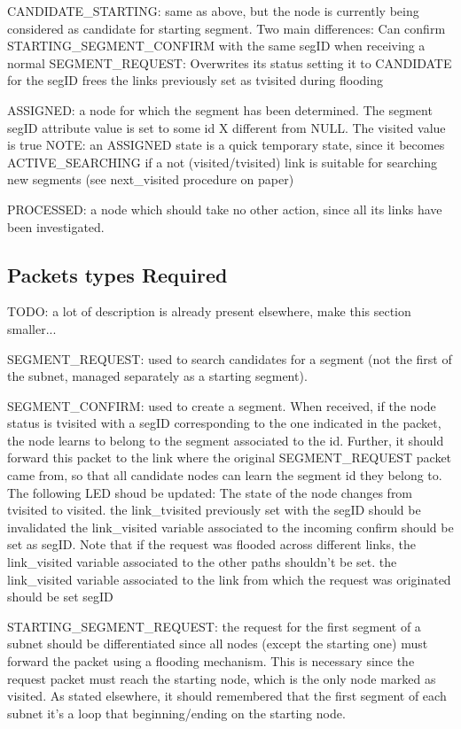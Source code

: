 \documentclass[conference]{IEEEtran}
\begin{document}
CANDIDATE\_STARTING:
same as above, but the node is currently being considered as candidate
for starting segment. Two main differences: Can confirm
STARTING\_SEGMENT\_CONFIRM with the same segID when receiving a normal
SEGMENT\_REQUEST: Overwrites its status setting it to CANDIDATE for the
segID frees the links previously set as tvisited during flooding

ASSIGNED: a node for which the segment has been determined.  The
segment segID attribute value is set to some id X different from NULL.
The visited value is true NOTE: an ASSIGNED state is a quick temporary
state, since it becomes ACTIVE\_SEARCHING if a not (visited/tvisited)
link is suitable for searching new segments (see next\_visited
procedure on paper) 

PROCESSED: a node which should take no other
action, since all its links have been investigated. 

\subsection{Packets types Required}
TODO: a lot of description is already present elsewhere, make this
section smaller...

SEGMENT\_REQUEST: used to search candidates for a segment (not the
first of the subnet, managed separately as a starting segment).

SEGMENT\_CONFIRM: used to create a segment. When received, if the node
status is tvisited with a segID corresponding to the one indicated in
the packet, the node learns to belong to the segment associated to the
id. Further, it should forward this packet to the link where the
original SEGMENT\_REQUEST packet came from, so that all candidate nodes
can learn the segment id they belong to. The following LED shoud be
updated: The state of the node changes from tvisited to visited.  the
link\_tvisited previously set with the segID should be invalidated the
link\_visited variable associated to the incoming confirm should be set
as segID. Note that if the request was flooded across different links,
the link\_visited variable associated to the other paths shouldn’t be
set.  the link\_visited variable associated to the link from which the
request was originated should be set segID

STARTING\_SEGMENT\_REQUEST: the request for the first segment of a
subnet should be differentiated since all nodes (except the starting
one) must forward the packet using a flooding mechanism. This is
necessary since the request packet must reach the starting node, which
is the only node marked as visited. As stated elsewhere, it should
remembered that the first segment of each subnet it's  a loop that
beginning/ending on the starting node.
\end{document}
